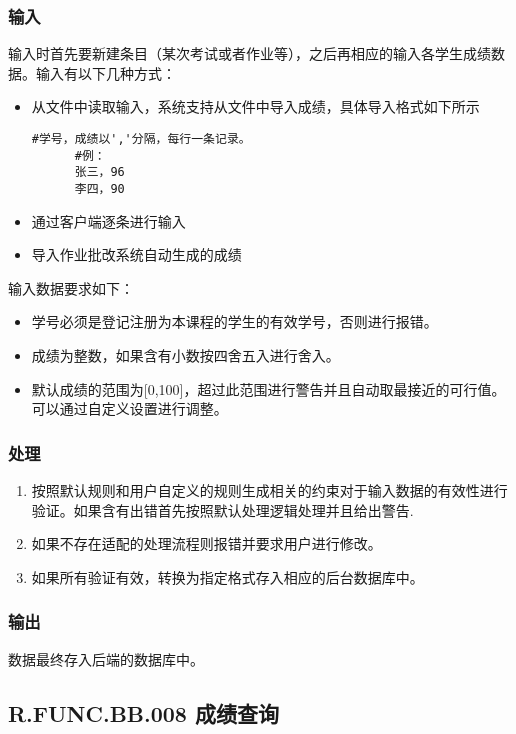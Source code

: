 \begin{enumerate}
    \subsubsection{输入}
    输入时首先要新建条目（某次考试或者作业等），之后再相应的输入各学生成绩数据。输入有以下几种方式：
    \begin{itemize}
      \item 从文件中读取输入，系统支持从文件中导入成绩，具体导入格式如下所示
      \begin{lstlisting}[caption=文件导入成绩示例, label={code:import_grade_from_file}]
      #学号，成绩以','分隔，每行一条记录。
      #例：
      张三，96
      李四，90
      \end{lstlisting}
      \item 通过客户端逐条进行输入
      \item 导入作业批改系统自动生成的成绩
    \end{itemize}
    输入数据要求如下：
    \begin{itemize}
      \item 学号必须是登记注册为本课程的学生的有效学号，否则进行报错。
      \item 成绩为整数，如果含有小数按四舍五入进行舍入。
      \item 默认成绩的范围为[0,100]，超过此范围进行警告并且自动取最接近的可行值。可以通过自定义设置进行调整。
    \end{itemize}
    \subsubsection{处理}
    \begin{enumerate}
      \item 按照默认规则和用户自定义的规则生成相关的约束对于输入数据的有效性进行验证。如果含有出错首先按照默认处理逻辑处理并且给出警告.
      \item 如果不存在适配的处理流程则报错并要求用户进行修改。
      \item 如果所有验证有效，转换为指定格式存入相应的后台数据库中。
    \end{enumerate}
    \subsubsection{输出}
    数据最终存入后端的数据库中。

  \subsection{R.FUNC.BB.008 成绩查询}

\end{enumerate}
